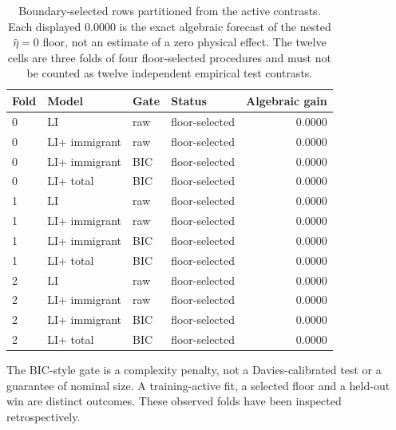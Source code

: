 \begin{table}[htbp]\centering\caption{Boundary-selected rows partitioned from the active contrasts. Each displayed $0.0000$ is the exact algebraic forecast of the nested $\hat\eta=0$ floor, not an estimate of a zero physical effect. The twelve cells are three folds of four floor-selected procedures and must not be counted as twelve independent empirical test contrasts.}\label{tab:s04-observed-boundary}

\begin{tabular}{llllr}\toprule Fold & Model & Gate & Status & Algebraic gain\\\midrule

0 & LI & raw & floor-selected & 0.0000 \\

0 & LI+ immigrant & raw & floor-selected & 0.0000 \\

0 & LI+ immigrant & BIC & floor-selected & 0.0000 \\

0 & LI+ total & BIC & floor-selected & 0.0000 \\

1 & LI & raw & floor-selected & 0.0000 \\

1 & LI+ immigrant & raw & floor-selected & 0.0000 \\

1 & LI+ immigrant & BIC & floor-selected & 0.0000 \\

1 & LI+ total & BIC & floor-selected & 0.0000 \\

2 & LI & raw & floor-selected & 0.0000 \\

2 & LI+ immigrant & raw & floor-selected & 0.0000 \\

2 & LI+ immigrant & BIC & floor-selected & 0.0000 \\

2 & LI+ total & BIC & floor-selected & 0.0000 \\

\bottomrule\end{tabular}\end{table}

The BIC-style gate is a complexity penalty, not a Davies-calibrated test or a guarantee of nominal size. A training-active fit, a selected floor and a held-out win are distinct outcomes. These observed folds have been inspected retrospectively.

